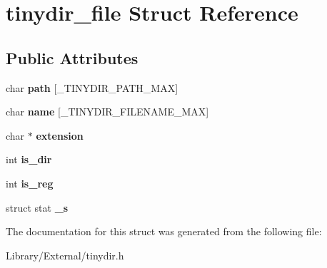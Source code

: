\hypertarget{structtinydir__file}{}\section{tinydir\+\_\+file Struct Reference}
\label{structtinydir__file}
\subsection*{Public Attributes}
\begin{DoxyCompactItemize}
\item 
\hypertarget{structtinydir__file_a84d716ed154fb4af871866856af95bdb}{}char {\bfseries path} \mbox{[}\+\_\+\+T\+I\+N\+Y\+D\+I\+R\+\_\+\+P\+A\+T\+H\+\_\+\+M\+A\+X\mbox{]}\label{structtinydir__file_a84d716ed154fb4af871866856af95bdb}

\item 
\hypertarget{structtinydir__file_af08987f1603e1cb849d34985ff2d1507}{}char {\bfseries name} \mbox{[}\+\_\+\+T\+I\+N\+Y\+D\+I\+R\+\_\+\+F\+I\+L\+E\+N\+A\+M\+E\+\_\+\+M\+A\+X\mbox{]}\label{structtinydir__file_af08987f1603e1cb849d34985ff2d1507}

\item 
\hypertarget{structtinydir__file_a0e760decbe09e679a4637d7d0630bf68}{}char $\ast$ {\bfseries extension}\label{structtinydir__file_a0e760decbe09e679a4637d7d0630bf68}

\item 
\hypertarget{structtinydir__file_a702617c7ea4fad8a0ebde539eec9e5a7}{}int {\bfseries is\+\_\+dir}\label{structtinydir__file_a702617c7ea4fad8a0ebde539eec9e5a7}

\item 
\hypertarget{structtinydir__file_a5d54c59718ccf7ada9fba3aec8c109bf}{}int {\bfseries is\+\_\+reg}\label{structtinydir__file_a5d54c59718ccf7ada9fba3aec8c109bf}

\item 
\hypertarget{structtinydir__file_a71140206c03eb005035143ec3032a712}{}struct stat {\bfseries \+\_\+s}\label{structtinydir__file_a71140206c03eb005035143ec3032a712}

\end{DoxyCompactItemize}


The documentation for this struct was generated from the following file\+:\begin{DoxyCompactItemize}
\item 
Library/\+External/tinydir.\+h\end{DoxyCompactItemize}
